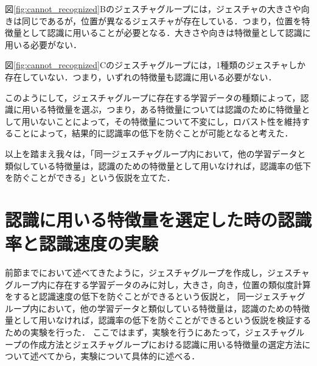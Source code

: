 図\ref{fig:cannot_recognized}Bのジェスチャグループには，ジェスチャの大きさや向きは同じであるが，位置が異なるジェスチャが存在している．つまり，位置を特徴量として認識に用いることが必要となる．大きさや向きは特徴量として認識に用いる必要がない．

図\ref{fig:cannot_recognized}Cのジェスチャグループには，1種類のジェスチャしか存在していない．つまり，いずれの特徴量も認識に用いる必要がない．

このようにして，ジェスチャグループに存在する学習データの種類によって，認識に用いる特徴量を選ぶ，つまり，ある特徴量については認識のために特徴量として用いないことによって，その特徴量について不変にし，ロバスト性を維持することによって，結果的に認識率の低下を防ぐことが可能となると考えた．

以上を踏まえ我々は，「同一ジェスチャグループ内において，他の学習データと類似している特徴量は，認識のための特徴量として用いなければ，認識率の低下を防ぐことができる」という仮説を立てた．

\section{認識に用いる特徴量を選定した時の認識率と認識速度の実験}
前節までにおいて述べてきたように，ジェスチャグループを作成し，ジェスチャグループ内に存在する学習データのみに対し，大きさ，向き，位置の類似度計算をすると認識速度の低下を防ぐことができるという仮説と，
同一ジェスチャグループ内において，他の学習データと類似している特徴量は，認識のための特徴量として用いなければ，認識率の低下を防ぐことができるという仮説を検証するための実験を行った．
ここではまず，実験を行うにあたって，ジェスチャグループの作成方法とジェスチャグループにおける認識に用いる特徴量の選定方法について述べてから，実験について具体的に述べる．

